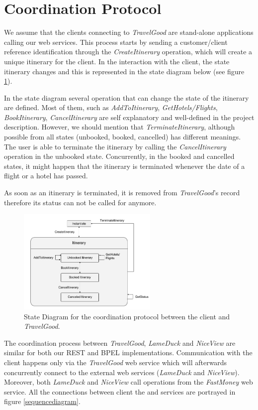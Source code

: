 \section{Coordination Protocol}

We assume that the clients connecting to \textit{TravelGood} are stand-alone applications calling our web services. This process starts by sending a customer/client reference identification through the \textit{CreateItinerary} operation, which will create a unique itinerary for the client. In the interaction with the client, the state itinerary changes and this is represented in the state diagram below (see figure \ref{statediagram}).  

In the state diagram several operation that can change the state of the itinerary are defined. Most of them, such as \textit{AddToItinerary}, \textit{GetHotels/Flights}, \textit{BookItinerary}, \textit{CancelItinerary} are self explanatory and well-defined in the project description. However, we should mention that \textit{TerminateItinerary}, although possible from all states (unbooked, booked, cancelled) has different meanings. The user is able to terminate the itinerary by calling the \textit{CancelItinerary} operation in the unbooked state. Concurrently, in the booked and cancelled states, it might happen that the itinerary is terminated whenever the date of a flight or a hotel has passed. 

As soon as an itinerary is terminated, it is removed from \textit{TravelGood}'s record therefore its status can not be called for anymore. 


\begin{figure}[H]
\centering
\includegraphics[width=0.6\textwidth]{images/StateDiagram}
\caption{State Diagram for the coordination protocol between the client and \textit{TravelGood}.}
\label{statediagram}
\end{figure}

The coordination process between \textit{TravelGood}, \textit{LameDuck} and \textit{NiceView} are similar for both our REST and BPEL implementations. Communication with the client happens only via the \textit{TravelGood} web service which will afterwards concurrently connect to the external web services (\textit{LameDuck} and \textit{NiceView}). Moreover, both \textit{LameDuck} and \textit{NiceView} call operations from the \textit{FastMoney} web service. All the connections between client the and services are portrayed in figure \ref{sequencediagram}. 

